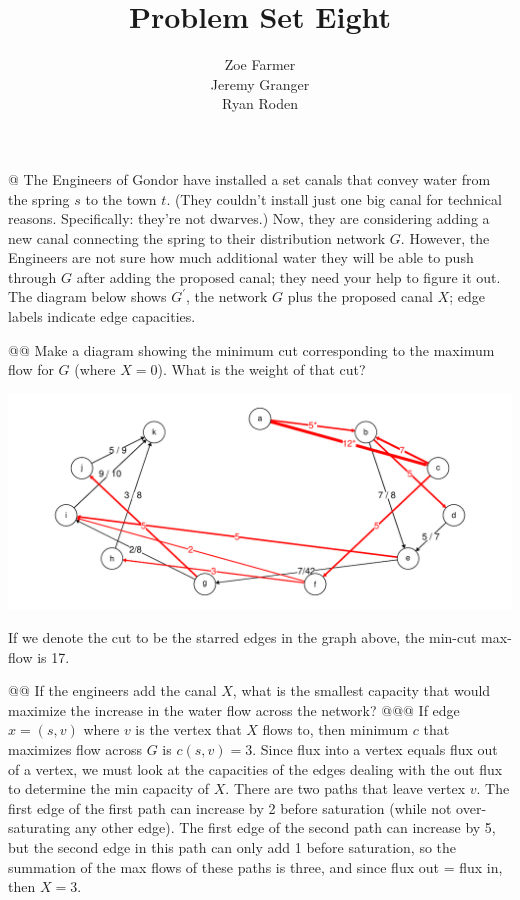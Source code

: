 \documentclass[10pt]{article}\usepackage[]{graphicx}\usepackage[]{xcolor}
\title{Problem Set Eight}
\author{Zoe Farmer\\Jeremy Granger\\Ryan Roden}
\makeatletter
\def\maxwidth{ %
  \ifdim\Gin@nat@width>\linewidth
    \linewidth
  \else
    \Gin@nat@width
  \fi
}
\newenvironment{knitrout}{}{} %
\makeatother
\begin{document}
\maketitle




\begin{easylist}[enumerate]
    @ The Engineers of Gondor have installed a set canals that convey water from the spring $s$ to the town $t$. (They
    couldn't install just one big canal for technical reasons. Specifically: they're not dwarves.) Now, they are
    considering adding a new canal connecting the spring to their distribution network $G$. However, the Engineers are
    not sure how much additional water they will be able to push through $G$ after adding the proposed canal; they need
    your help to figure it out. The diagram below shows $G^\prime$, the network $G$ plus the proposed canal $X$; edge
    labels indicate edge capacities.

    @@ Make a diagram showing the minimum cut corresponding to the maximum flow for $G$ (where $X = 0$). What is the
    weight of that cut?

\begin{knitrout}
\color{fgcolor}

{\centering \includegraphics[width=\maxwidth]{figure/unnamed-chunk-2} 

}



\end{knitrout}


    If we denote the cut to be the starred edges in the graph above, the min-cut max-flow is 17.

    @@ If the engineers add the canal $X$, what is the smallest capacity that would maximize the increase in the water
    flow across the network?
    @@@ If edge $x = (s,v)$ where $v$ is the vertex that $X$ flows to, then minimum $c$ that maximizes flow across $G$
    is $c(s,v) = 3$.  Since flux into a vertex equals flux out of a vertex, we must look at the capacities of the edges
    dealing with the out flux to determine the min capacity of $X$.  There are two paths that leave vertex $v$.  The
    first edge of the first path can increase by 2 before saturation (while not over-saturating any other edge).  The
    first edge of the second path can increase by 5, but the second edge in this path can only add 1 before saturation,
    so the summation of the max flows of these paths is three, and since flux out = flux in, then $X = 3$.


\end{easylist}
\end{document}
